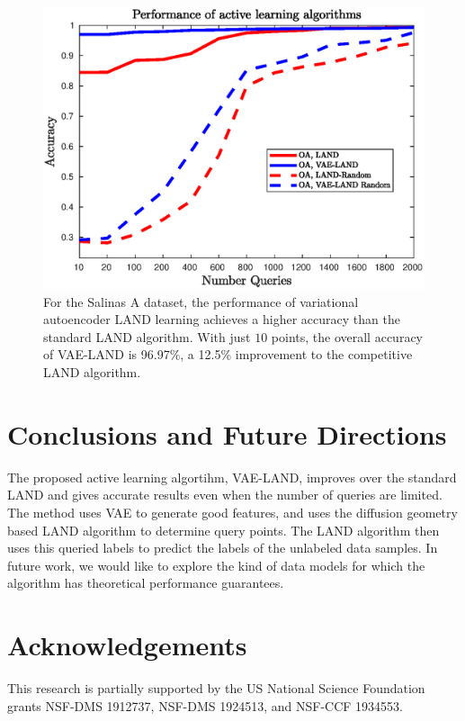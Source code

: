 \documentclass{article}
\begin{document}
\begin{figure}
    \includegraphics[width=.45\textwidth]{Images/salinasa_results_improved.eps}
    \caption{For the Salinas A dataset, the performance of variational autoencoder LAND learning achieves a higher accuracy than the standard LAND algorithm. With just $10$ points, the overall accuracy of VAE-LAND is 96.97\%, a 12.5\% improvement to the competitive LAND algorithm.}
    \label{fig:my_label}
\end{figure}


\section{Conclusions and Future Directions}
\label{sec:Conclusions}
The proposed active learning algortihm, VAE-LAND, improves over the standard LAND and gives accurate results even when the number of queries are limited. The method uses VAE to generate good features, and uses the diffusion geometry based LAND algorithm to determine query points. The LAND algorithm then uses this queried labels to predict the labels of the unlabeled data samples. In future work, we would like to explore the kind of data models for which the algorithm has theoretical performance guarantees.   
\section*{Acknowledgements}

This research is partially supported by the US National Science Foundation grants NSF-DMS 1912737, NSF-DMS 1924513, and NSF-CCF 1934553.






\end{document}
